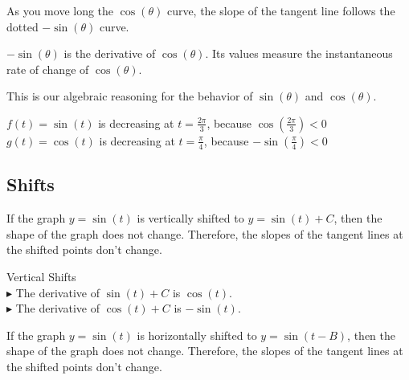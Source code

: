 \documentclass{ximera}
\begin{document}
As you move long the $\cos(\theta)$ curve, the slope of the tangent line follows the dotted $-\sin(\theta)$ curve.



\begin{center}
\end{center}



$-\sin(\theta)$ is the derivative of $\cos(\theta)$.  Its values measure the instantaneous rate of change of $\cos(\theta)$.









This is our algebraic reasoning for the behavior of $\sin(\theta)$ and $\cos(\theta)$.






$f(t) = \sin(t)$ is decreasing at $t=\frac{2\pi}{3}$, because $\cos\left( \frac{2\pi}{3} \right) < 0$ \\


$g(t) = \cos(t)$ is decreasing at $t=\frac{\pi}{4}$, because $-\sin\left( \frac{\pi}{4} \right) < 0$



\subsection{Shifts}




If the graph $y = \sin(t)$ is vertically shifted to $y = \sin(t)+C$, then the shape of the graph does not change. Therefore, the slopes of the tangent lines at the shifted points don't change.



\begin{observation} Vertical Shifts \\

$\blacktriangleright$ The derivative of $\sin(t)+C$ is $\cos(t)$. \\

$\blacktriangleright$ The derivative of $\cos(t)+C$ is $-\sin(t)$. \\

\end{observation}




If the graph $y = \sin(t)$ is horizontally shifted to $y = \sin(t - B)$, then the shape of the graph does not change. Therefore, the slopes of the tangent lines at the shifted points don't change.
\end{document}
